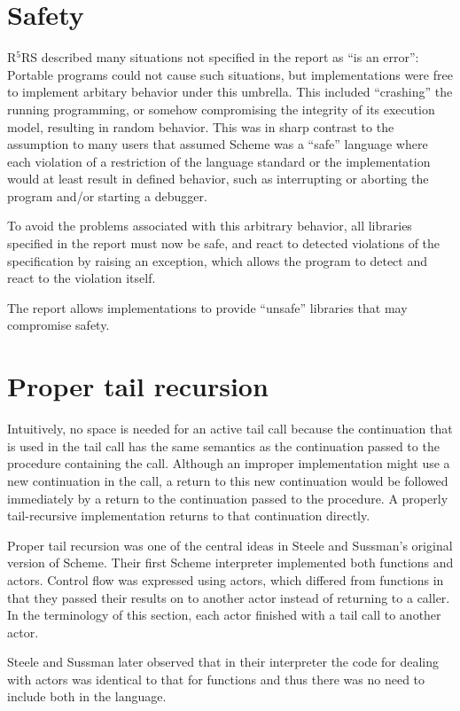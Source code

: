 \documentclass[twoside,twocolumn]{algol60}
\newcommand{\rn}[1]{R$^{#1}$RS}
\begin{document}
\section{Safety}

\rn{5} described many situations not specified in the report as ``is
an error'': Portable programs could not cause such situations, but
implementations were free to implement arbitary behavior under this
umbrella.  This included ``crashing'' the running programming, or
somehow compromising the integrity of its execution model, resulting
in random behavior.  This was in sharp contrast to the assumption to
many users that assumed Scheme was a ``safe'' language where each
violation of a restriction of the language standard or the
implementation would at least result in defined behavior, such as
interrupting or aborting the program and/or starting a debugger.

To avoid the problems associated with this arbitrary behavior, all
libraries specified in the report must now be safe, and react to
detected violations of the specification by raising
an exception, which allows the program to detect and react
to the violation itself.

The report allows implementations to provide ``unsafe'' libraries that
may compromise safety.

\section{Proper tail recursion}

Intuitively, no space is needed for an active tail call because the
continuation that is used in the tail call has the same semantics as the
continuation passed to the procedure containing the call.  Although an improper
implementation might use a new continuation in the call, a return
to this new continuation would be followed immediately by a return
to the continuation passed to the procedure.  A properly tail-recursive
implementation returns to that continuation directly.

Proper tail recursion was one of the central ideas in Steele and
Sussman's original version of Scheme.  Their first Scheme interpreter
implemented both functions and actors.  Control flow was expressed using
actors, which differed from functions in that they passed their results
on to another actor instead of returning to a caller.  In the terminology
of this section, each actor finished with a tail call to another actor.

Steele and Sussman later observed that in their interpreter the code
for dealing with actors was identical to that for functions and thus
there was no need to include both in the language.
\end{document}
